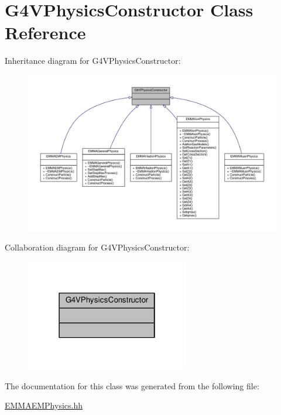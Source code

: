 \hypertarget{classG4VPhysicsConstructor}{}\section{G4\+V\+Physics\+Constructor Class Reference}
\label{classG4VPhysicsConstructor}


Inheritance diagram for G4\+V\+Physics\+Constructor\+:
\nopagebreak
\begin{figure}[H]
\begin{center}
\leavevmode
\includegraphics[width=350pt]{classG4VPhysicsConstructor__inherit__graph}
\end{center}
\end{figure}


Collaboration diagram for G4\+V\+Physics\+Constructor\+:
\nopagebreak
\begin{figure}[H]
\begin{center}
\leavevmode
\includegraphics[width=202pt]{classG4VPhysicsConstructor__coll__graph}
\end{center}
\end{figure}


The documentation for this class was generated from the following file\+:\begin{DoxyCompactItemize}
\item 
\hyperlink{EMMAEMPhysics_8hh}{E\+M\+M\+A\+E\+M\+Physics.\+hh}\end{DoxyCompactItemize}
